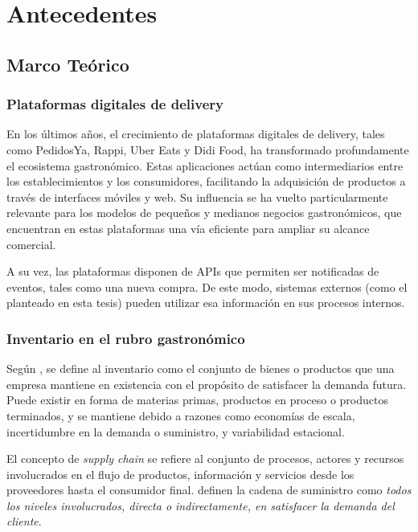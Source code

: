 \chapter{Antecedentes}\label{chapter02}

\section{Marco Teórico}

\subsection{Plataformas digitales de delivery}

En los últimos años, el crecimiento de plataformas digitales de delivery, tales como PedidosYa, Rappi, Uber Eats y Didi Food, ha transformado profundamente el ecosistema gastronómico. Estas aplicaciones actúan como intermediarios entre los establecimientos y los consumidores, facilitando la adquisición de productos a través de interfaces móviles y web. Su influencia se ha vuelto particularmente relevante para los modelos de pequeños y medianos negocios gastronómicos, que encuentran en estas plataformas una vía eficiente para ampliar su alcance comercial.

A su vez, las plataformas disponen de APIs que permiten ser notificadas de eventos, tales como una nueva compra. De este modo, sistemas externos (como el planteado en esta tesis) pueden utilizar esa información en sus procesos internos.

\subsection{Inventario en el rubro gastronómico}

Según \parencite{chopra2019supply}, se define al inventario como el conjunto de bienes o productos que una empresa mantiene en existencia con el propósito de satisfacer la demanda futura. Puede existir en forma de materias primas, productos en proceso o productos terminados, y se mantiene debido a razones como economías de escala, incertidumbre en la demanda o suministro, y variabilidad estacional.

El concepto de \emph{supply chain} se refiere al conjunto de procesos, actores y recursos involucrados en el flujo de productos, información y servicios desde los proveedores hasta el consumidor final. \parencite{chopra2019supply} definen la cadena de suministro como \guillemotleft \emph{todos los niveles involucrados, directa o indirectamente, en satisfacer la demanda del cliente}\guillemotright.

